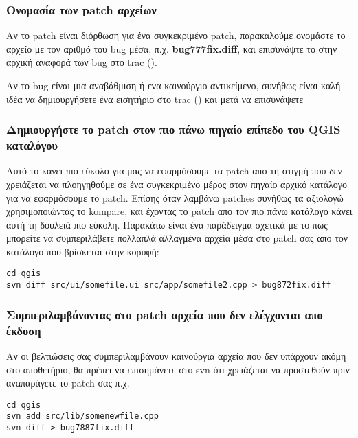 \hypertarget{toc40}{}
\subsubsection{Ονομασία των patch αρχείων}
Αν το patch είναι διόρθωση για ένα συγκεκριμένο patch, παρακαλούμε ονομάστε το αρχείο με τον αριθμό του bug μέσα, π.χ.  \textbf{bug777fix.diff},  και επισυνάψτε το στην αρχική αναφορά των bug στο  trac ().

Αν το bug είναι μια αναβάθμιση ή ενα καινούργιο αντικείμενο, συνήθως είναι καλή ιδέα να δημιουργήσετε ένα εισητήριο στο trac () και μετά να επισυνάψετε 

\hypertarget{toc41}{}
\subsubsection{Δημιουργήστε το patch στον πιο πάνω πηγαίο επίπεδο του QGIS καταλόγου}
Αυτό το κάνει πιο εύκολο για μας να εφαρμόσουμε τα patch απο τη στιγμή που δεν χρειάζεται να πλοηγηθούμε σε ένα συγκεκριμένο μέρος στον πηγαίο αρχικό κατάλογο για να εφαρμόσουμε το patch. Επίσης όταν λαμβάνω patches συνήθως τα αξιολογώ χρησιμοποιώντας το kompare, και έχοντας το patch απο τον πιο πάνω κατάλογο κάνει αυτή τη δουλειά πιο εύκολη. Παρακάτω είναι ένα παράδειγμα σχετικά με το πως μπορείτε να συμπεριλάβετε πολλαπλά αλλαγμένα αρχεία μέσα στο patch σας απο τον κατάλογο που βρίσκεται στην κορυφή:

\begin{verbatim}
cd qgis
svn diff src/ui/somefile.ui src/app/somefile2.cpp > bug872fix.diff
\end{verbatim}

\hypertarget{toc42}{}
\subsubsection{Συμπεριλαμβάνοντας στο patch αρχεία που δεν ελέγχονται απο έκδοση}
Αν οι βελτιώσεις σας συμπεριλαμβάνουν καινούργια αρχεία που δεν υπάρχουν ακόμη στο αποθετήριο, θα πρέπει να επισημάνετε στο svn ότι χρειάζεται να προστεθούν πριν αναπαράγετε το patch σας π.χ.

\begin{verbatim}
cd qgis
svn add src/lib/somenewfile.cpp
svn diff > bug7887fix.diff
\end{verbatim}

\hypertarget{toc43}{}
